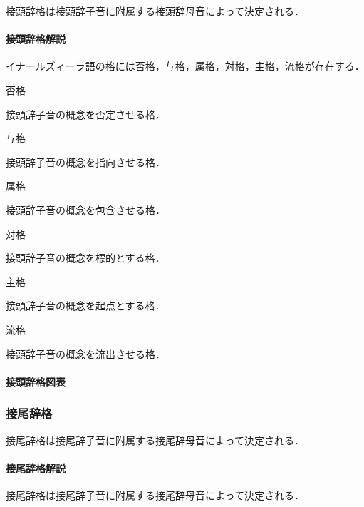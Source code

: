 \documentclass[
  japanese,
]{article}
\providecommand{\tightlist}{%
  \setlength{\itemsep}{0pt}\setlength{\parskip}{0pt}}
\begin{document}
\protect{}\label{prefix-case}{接頭辞格}は接頭辞子音に附属する接頭辞母音によって決定される．

\paragraph{接頭辞格解説}\label{subsection5.4.1}

イナールズィーラ語の格には否格，与格，属格，対格，主格，流格が存在する．

\begin{description}
\tightlist
\item[{◌a◌◌◌}]
否格

接頭辞子音の概念を否定させる格．
\item[{◌e◌◌◌}]
与格

接頭辞子音の概念を指向させる格．
\item[{◌i◌◌◌}]
属格

接頭辞子音の概念を包含させる格．
\item[{◌o◌◌◌}]
対格

接頭辞子音の概念を標的とする格．
\item[{◌u◌◌◌}]
主格

接頭辞子音の概念を起点とする格．
\item[{◌w◌◌◌}]
流格

接頭辞子音の概念を流出させる格．
\end{description}

\paragraph{接頭辞格図表}\label{subsection5.4.2}

\subsubsection{接尾辞格}\label{section5.5}

\protect{}\label{suffix-case}{接尾辞格}は接尾辞子音に附属する接尾辞母音によって決定される．

\paragraph{接尾辞格解説}\label{subsection5.5.1}

接尾辞格は接尾辞子音に附属する接尾辞母音によって決定される．
\end{document}
